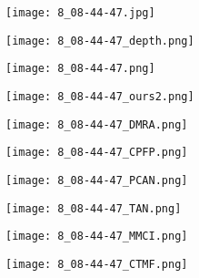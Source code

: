 \documentclass[runningheads]{llncs}
\begin{document}
\begin{figure}[t]
\captionsetup[subfigure]{labelformat=empty}	
	\centering
	\begin{subfigure}[t]{1.13cm}
		\centering
		\texttt{[image: 8\_08-44-47.jpg]}
	\end{subfigure}
	\begin{subfigure}[t]{1.13cm}
		\centering
		\texttt{[image: 8\_08-44-47\_depth.png]}
	\end{subfigure}
	\begin{subfigure}[t]{1.13cm}
		\centering
		\texttt{[image: 8\_08-44-47.png]}
	\end{subfigure}
	\begin{subfigure}[t]{1.13cm}
		\centering
		\texttt{[image: 8\_08-44-47\_ours2.png]}
	\end{subfigure}
	\begin{subfigure}[t]{1.13cm}
		\centering
		\texttt{[image: 8\_08-44-47\_DMRA.png]}
	\end{subfigure}
	\begin{subfigure}[t]{1.13cm}
		\centering
		\texttt{[image: 8\_08-44-47\_CPFP.png]}
	\end{subfigure}
	\begin{subfigure}[t]{1.13cm}
		\centering
		\texttt{[image: 8\_08-44-47\_PCAN.png]}
	\end{subfigure}
	\begin{subfigure}[t]{1.13cm}
		\centering
		\texttt{[image: 8\_08-44-47\_TAN.png]}
	\end{subfigure}
	\begin{subfigure}[t]{1.13cm}
		\centering
		\texttt{[image: 8\_08-44-47\_MMCI.png]}
	\end{subfigure}
	\begin{subfigure}[t]{1.13cm}
		\centering
		\texttt{[image: 8\_08-44-47\_CTMF.png]}
	\end{subfigure}
	
	\vspace{1pt}
	

\end{figure}
\end{document}
